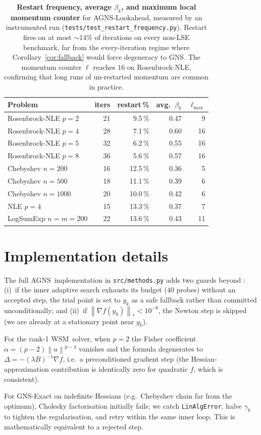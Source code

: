 \documentclass[conference]{IEEEtran}
\theoremstyle{remark}
\newcommand{\dnorm}[1]{\left\lVert#1\right\rVert_*}
\newcommand{\norm}[1]{\left\lVert#1\right\rVert}
\newcommand{\AGNS}{\textsc{AGNS}}
\newcommand{\GNS}{\textsc{GNS}}
\newcommand{\WSM}{\textsc{WSM}}
\begin{document}
\begin{table}[h]
\centering
\small
\caption{\textbf{Restart frequency, average $\beta_k$, and maximum
local momentum counter} for \AGNS-Lookahead, measured by an
instrumented run (\texttt{tests/test\_restart\_frequency.py}).
Restart fires on at most $\sim 14\%$ of iterations on every
non-LSE benchmark, far from the every-iteration regime where
Corollary~\ref{cor:fallback} would force degeneracy to \GNS. The momentum
counter $\ell$ reaches $16$ on Rosenbrock-NLE, confirming that long
runs of un-restarted momentum are common in practice.}
\label{tab:restart}
\begin{tabular}{@{}lrrrr@{}}
\toprule
Problem & iters & restart\,\% & avg.\ $\beta_k$ & $\ell_{\max}$ \\
\midrule
Rosenbrock-NLE $p=2$ & 21 & 9.5\,\% & 0.47 & 9 \\
Rosenbrock-NLE $p=4$ & 28 & 7.1\,\% & 0.60 & 16 \\
Rosenbrock-NLE $p=5$ & 32 & 6.2\,\% & 0.55 & 16 \\
Rosenbrock-NLE $p=8$ & 36 & 5.6\,\% & 0.57 & 16 \\
Chebyshev $n=200$  & 16 & 12.5\,\% & 0.36 & 5 \\
Chebyshev $n=500$  & 18 & 11.1\,\% & 0.39 & 6 \\
Chebyshev $n=1000$ & 20 & 10.0\,\% & 0.42 & 6 \\
NLE $p=4$          & 15 & 13.3\,\% & 0.37 & 7 \\
LogSumExp $n{=}m{=}200$ & 22 & 13.6\,\% & 0.43 & 11 \\
\bottomrule
\end{tabular}
\end{table}

\section{Implementation details}
\label{app:algo}

The full \AGNS\ implementation in \texttt{src/methods.py} adds two
guards beyond : (i)~if the inner adaptive search
exhausts its budget ($40$ probes) without an accepted step, the trial
point is set to $y_k$ as a safe fallback rather than committed
unconditionally; and (ii)~if $\dnorm{\nabla f(y_k)} < 10^{-8}$, the
Newton step is skipped (we are already at a stationary point near
$y_k$).

For the rank-1 \WSM\ solver, when $p = 2$ the Fisher coefficient
$\alpha = (p-2)\norm{u}^{p-4}$ vanishes and the formula degenerates
to $\Delta = -(\lambda B)^{-1}\nabla f$, i.e.\ a preconditioned
gradient step (the Hessian-approximation contribution is identically
zero for quadratic $f$, which is consistent).

For \GNS-Exact on indefinite Hessians (e.g.\ Chebyshev chain far from
the optimum), Cholesky factorisation initially fails; we catch
\texttt{LinAlgError}, halve $\gamma_k$ to tighten the regularisation,
and retry within the same inner loop. This is mathematically
equivalent to a rejected step.
\end{document}
